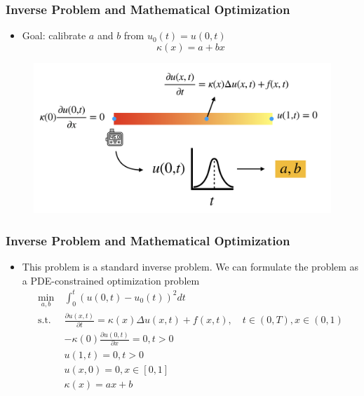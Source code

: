 \documentclass{beamer}
\begin{document}
\begin{frame}
	\frametitle{Inverse Problem and Mathematical Optimization}
	\begin{itemize}
\item Goal: calibrate $a$ and $b$ from $u_0(t) = u(0, t)$
$$\kappa(x) = a + bx$$
	\end{itemize}	
	\begin{figure}
		\centering
		\includegraphics[width=1.0\textwidth]{figures/measure}
	\end{figure}

\end{frame}
\begin{frame}
	\frametitle{Inverse Problem and Mathematical Optimization}
	\begin{itemize}
		\item This problem is a standard inverse problem. We can formulate the problem as a PDE-constrained optimization problem
		$$\begin{aligned}
\min_{a, b}\ & \int_{0}^t ( u(0, t)- u_0(t))^2 dt\\
\mathrm{s.t.}\ & \frac{\partial u(x, t)}{\partial t} = \kappa(x)\Delta u(x, t) + f(x, t), \quad t\in (0,T), x\in (0,1) \\
& -\kappa(0)\frac{\partial u(0,t)}{\partial x} = 0, t>0\\
& u(1, t) = 0, t>0\\
& u(x, 0) = 0, x\in [0,1]\\
& \kappa(x) = a x + b
\end{aligned}$$

	\end{itemize}
\end{frame}
\end{document}
